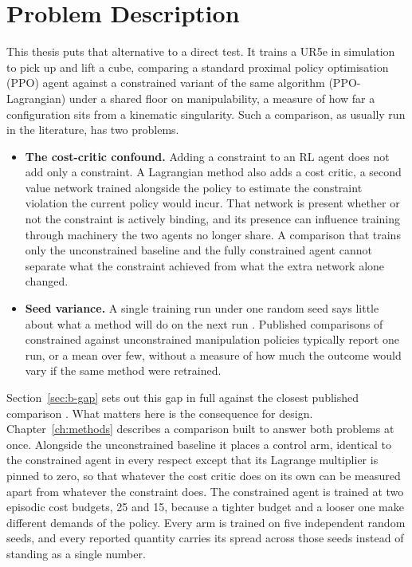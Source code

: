 \section{Problem Description}\label{sec:i-problem}

This thesis puts that alternative to a direct test. It trains a UR5e in simulation to pick up and
lift a cube, comparing a standard proximal policy optimisation (PPO) agent against a constrained
variant of the same algorithm (PPO-Lagrangian) under a shared floor on manipulability, a measure of
how far a configuration sits from a kinematic singularity. Such a comparison, as usually run in the
literature, has two problems.

\begin{itemize}
  \item \textbf{The cost-critic confound.} Adding a constraint to an RL agent does not add only a
  constraint. A Lagrangian method also adds a cost critic, a second value network trained
  alongside the policy to estimate the constraint violation the current policy would incur. That
  network is present whether or not the constraint is actively binding, and its presence can
  influence training through machinery the two agents no longer share. A comparison that trains
  only the unconstrained baseline and the fully constrained agent cannot separate what the
  constraint achieved from what the extra network alone changed.
  \item \textbf{Seed variance.} A single training run under one random seed says little about what
  a method will do on the next run \cite{henderson2018matters}. Published comparisons of
  constrained against unconstrained manipulation policies typically report one run, or a mean over
  few, without a measure of how much the outcome would vary if the same method were retrained.
\end{itemize}

Section~\ref{sec:b-gap} sets out this gap in full against the closest published comparison
\cite{khan2026rl_precision_grasping}. What matters here is the consequence for design.
Chapter~\ref{ch:methods} describes a comparison built to answer both problems at once. Alongside
the unconstrained baseline it places a control arm, identical to the constrained agent in every
respect except that its Lagrange multiplier is pinned to zero, so that whatever the cost critic
does on its own can be measured apart from whatever the constraint does. The constrained agent is
trained at two episodic cost budgets, 25 and 15, because a tighter budget and a looser one make
different demands of the policy. Every arm is trained on five independent random seeds, and every
reported quantity carries its spread across those seeds instead of standing as a single number.


